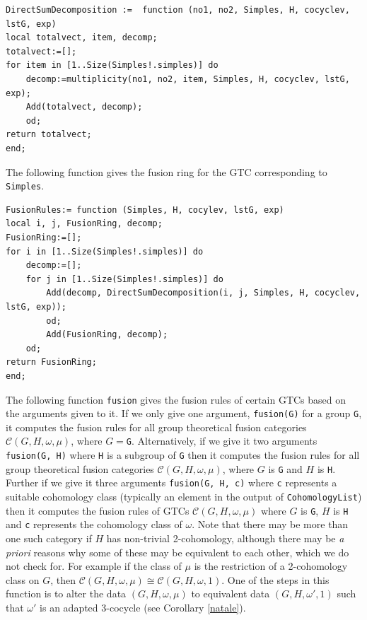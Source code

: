 \documentclass[a4paper, 10pt]{book}
\theoremstyle{definition}
\numberwithin{equation}{chapter}
\newcommand\lstl{\lstinline}
\newcommand\C{\mathcal C}
\begin{document}
\begin{lstlisting}
DirectSumDecomposition :=  function (no1, no2, Simples, H, cocyclev, lstG, exp)
local totalvect, item, decomp;
totalvect:=[];
for item in [1..Size(Simples!.simples)] do
	decomp:=multiplicity(no1, no2, item, Simples, H, cocyclev, lstG, exp);
 	Add(totalvect, decomp); 
 	od;
return totalvect;
end;

\end{lstlisting}
The following function gives the fusion ring for the GTC corresponding to \lstl{Simples}.
\begin{lstlisting}
FusionRules:= function (Simples, H, cocylev, lstG, exp)
local i, j, FusionRing, decomp;
FusionRing:=[];
for i in [1..Size(Simples!.simples)] do
	decomp:=[];
	for j in [1..Size(Simples!.simples)] do
		Add(decomp, DirectSumDecomposition(i, j, Simples, H, cocyclev, lstG, exp)); 
		od;
		Add(FusionRing, decomp);
	od;
return FusionRing;
end;

\end{lstlisting}
The following function \lstl{fusion} gives the fusion rules of certain GTCs based on the arguments given to it. If we only give one argument, \lstl{fusion(G)} for a group \lstl{G}, it computes the fusion rules for all group theoretical fusion categories $\C(G, H, \omega, \mu)$, where $G=$\lstl{G}. Alternatively, if we give it two arguments \lstl{fusion(G, H)}  where \lstl{H} is a subgroup of \lstl{G} then it computes the fusion rules for all group theoretical fusion categories $\C(G, H, \omega, \mu)$, where $G$ is \lstl{G} and $H$ is \lstl{H}. Further if we give it three arguments \lstl{fusion(G, H, c)} where \lstl{c} represents a suitable cohomology class (typically an element in the output of \lstl{CohomologyList}) then it computes the fusion rules of GTCs $\C(G, H, \omega, \mu)$ where $G$ is \lstl{G}, $H$ is \lstl{H} and \lstl{c} represents the cohomology class of $\omega$. Note that there may be more than one such category if $H$ has non-trivial 2-cohomology, although there may be \textit{a priori} reasons why some of these may be equivalent to each other, which we do not check for. For example if the class of $\mu$ is the restriction of a 2-cohomology class on $G$, then $\C(G, H , \omega, \mu) \cong \C(G, H, \omega, 1)$. One of the steps in this function is to alter the data $(G, H, \omega, \mu)$ to equivalent data $(G, H, \omega', 1)$ such that $\omega'$ is an adapted 3-cocycle (see Corollary \ref{natale}).
\end{document}
